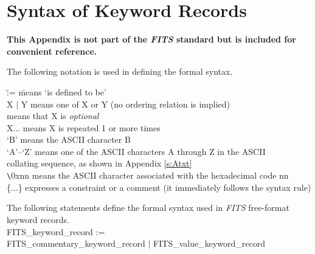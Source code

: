\documentclass[11pt,makeidx]{book}     %
\begin{document}
  
\appendix

  \chapter{Syntax of Keyword Records}
  \label{s:FormSyn}

{\bf This Appendix is not part of the {\em FITS\/} standard but is 
included for convenient reference.}

The following notation is used in defining the formal syntax.

\begin{tabbing}
\null \hspace{0.5in} \= := \hspace{0.5in} \= means `is defined to be' \\
\>X $|$ Y \> means one of X or Y (no ordering relation is implied) \\
\>[X]	\> means that X is {\em optional} \\
\>X...	\> means X is repeated 1 or more times \\
\>`B'	\> means the ASCII character B \\
\>`A'--`Z' \> means one of the ASCII characters A through Z in the ASCII \\
\>      \> collating sequence, as shown in Appendix \ref{s:Atxt} \\
\>\verb+\+0xnn \> means the ASCII character associated with the 
	hexadecimal code nn \\
\>\{...\}	\> expresses a constraint or a comment (it immediately 
	follows the syntax rule) \\
\end{tabbing}

The following statements define the formal syntax used in 
{\em FITS\/} free-format keyword records.\\

FITS\_keyword\_record := \\ \null \hspace{0.5in}
	FITS\_commentary\_keyword\_record $|$ FITS\_value\_keyword\_record \\
\end{document}
